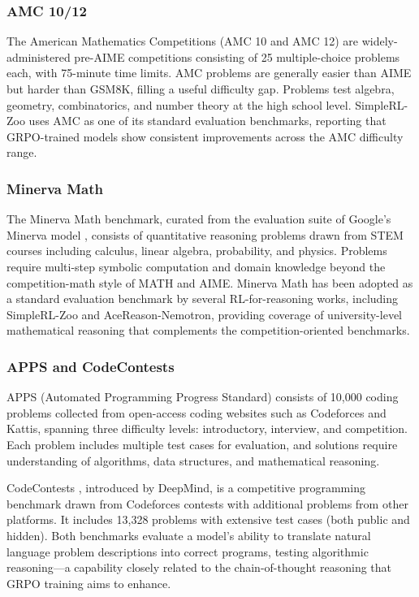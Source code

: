 \documentclass[12pt,a4paper]{report}
\begin{document}
\subsubsection{AMC 10/12}

The American Mathematics Competitions (AMC 10 and AMC 12) are widely-administered pre-AIME competitions consisting of 25 multiple-choice problems each, with 75-minute time limits. AMC problems are generally easier than AIME but harder than GSM8K, filling a useful difficulty gap. Problems test algebra, geometry, combinatorics, and number theory at the high school level. SimpleRL-Zoo \cite{zeng2025simplerl} uses AMC as one of its standard evaluation benchmarks, reporting that GRPO-trained models show consistent improvements across the AMC difficulty range.

\subsubsection{Minerva Math}

The Minerva Math benchmark, curated from the evaluation suite of Google's Minerva model \cite{lewkowycz2022minerva}, consists of quantitative reasoning problems drawn from STEM courses including calculus, linear algebra, probability, and physics. Problems require multi-step symbolic computation and domain knowledge beyond the competition-math style of MATH and AIME. Minerva Math has been adopted as a standard evaluation benchmark by several RL-for-reasoning works, including SimpleRL-Zoo and AceReason-Nemotron, providing coverage of university-level mathematical reasoning that complements the competition-oriented benchmarks.

\subsubsection{APPS and CodeContests}

APPS \cite{hendrycks2021apps} (Automated Programming Progress Standard) consists of 10,000 coding problems collected from open-access coding websites such as Codeforces and Kattis, spanning three difficulty levels: introductory, interview, and competition. Each problem includes multiple test cases for evaluation, and solutions require understanding of algorithms, data structures, and mathematical reasoning.

CodeContests \cite{li2022codecontests}, introduced by DeepMind, is a competitive programming benchmark drawn from Codeforces contests with additional problems from other platforms. It includes 13,328 problems with extensive test cases (both public and hidden). Both benchmarks evaluate a model's ability to translate natural language problem descriptions into correct programs, testing algorithmic reasoning---a capability closely related to the chain-of-thought reasoning that GRPO training aims to enhance.
\end{document}
